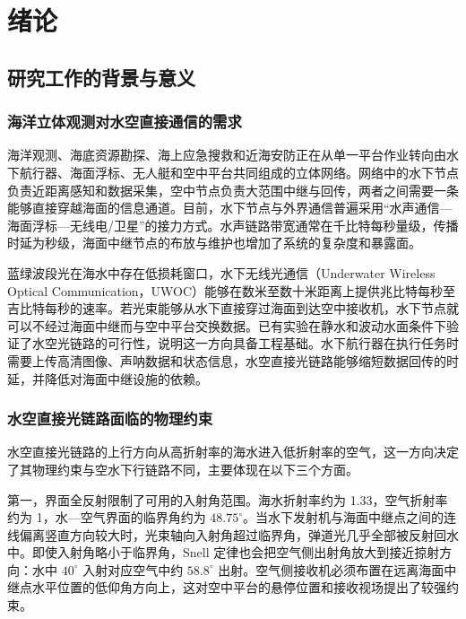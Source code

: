 \chapter{绪\hspace{6pt}论}
\label{chap:intro}

\section{研究工作的背景与意义}

\subsection{海洋立体观测对水空直接通信的需求}

海洋观测、海底资源勘探、海上应急搜救和近海安防正在从单一平台作业转向由水下航行器、海面浮标、无人艇和空中平台共同组成的立体网络。网络中的水下节点负责近距离感知和数据采集，空中节点负责大范围中继与回传，两者之间需要一条能够直接穿越海面的信息通道。目前，水下节点与外界通信普遍采用“水声通信—海面浮标—无线电/卫星”的接力方式。水声链路带宽通常在千比特每秒量级，传播时延为秒级，海面中继节点的布放与维护也增加了系统的复杂度和暴露面。

蓝绿波段光在海水中存在低损耗窗口，水下无线光通信（Underwater Wireless Optical Communication，UWOC）能够在数米至数十米距离上提供兆比特每秒至吉比特每秒的速率。若光束能够从水下直接穿过海面到达空中接收机，水下节点就可以不经过海面中继而与空中平台交换数据。已有实验在静水和波动水面条件下验证了水空光链路的可行性，说明这一方向具备工程基础。水下航行器在执行任务时需要上传高清图像、声呐数据和状态信息，水空直接光链路能够缩短数据回传的时延，并降低对海面中继设施的依赖。

\subsection{水空直接光链路面临的物理约束}

水空直接光链路的上行方向从高折射率的海水进入低折射率的空气，这一方向决定了其物理约束与空水下行链路不同，主要体现在以下三个方面。

第一，界面全反射限制了可用的入射角范围。海水折射率约为 1.33，空气折射率约为 1，水—空气界面的临界角约为 $48.75^\circ$。当水下发射机与海面中继点之间的连线偏离竖直方向较大时，光束轴向入射角超过临界角，弹道光几乎全部被反射回水中。即使入射角略小于临界角，Snell 定律也会把空气侧出射角放大到接近掠射方向：水中 $40^\circ$ 入射对应空气中约 $58.8^\circ$ 出射。空气侧接收机必须布置在远离海面中继点水平位置的低仰角方向上，这对空中平台的悬停位置和接收视场提出了较强约束。

